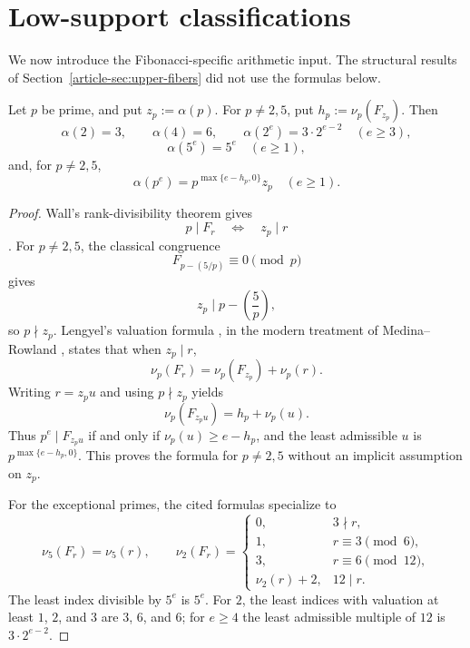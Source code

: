 \section{Low-support classifications}\label{sec:low-support}

We now introduce the Fibonacci-specific arithmetic input. The structural
results of Section~\ref{article-sec:upper-fibers} did not use the formulas below.

\begin{proposition}
\label{prop:prime-power-ladders}
Let $p$ be prime, and put $z_p:=\alpha(p)$. For $p\ne2,5$, put
$h_p:=\nu_p(F_{z_p})$. Then
\[
\alpha(2)=3,\qquad \alpha(4)=6,\qquad
\alpha(2^e)=3\cdot2^{e-2}\quad(e\ge3),
\]
\[
\alpha(5^e)=5^e\quad(e\ge1),
\]
and, for $p\ne2,5$,
\[
\alpha(p^e)=p^{\max\{e-h_p,0\}}z_p\quad(e\ge1).
\]
\end{proposition}

\begin{proof}
Wall's rank-divisibility theorem gives
\[
p\mid F_r\quad\Longleftrightarrow\quad z_p\mid r
\]
\cite{Wall1960FibonacciModm}. For $p\ne2,5$, the classical congruence
\[
F_{p-(5/p)}\equiv0\pmod p
\]
gives
\[
z_p\mid p-\left(\frac5p\right),
\]
so $p\nmid z_p$. Lengyel's valuation formula
\cite[Theorems~1 and~2]{Lengyel1995OrderFibonacciLucas}, in the modern
treatment of Medina--Rowland \cite{MedinaRowland2015PRegularity}, states that
when $z_p\mid r$,
\[
\nu_p(F_r)=\nu_p(F_{z_p})+\nu_p(r).
\]
Writing $r=z_pu$ and using $p\nmid z_p$ yields
\[
\nu_p(F_{z_pu})=h_p+\nu_p(u).
\]
Thus $p^e\mid F_{z_pu}$ if and only if
$\nu_p(u)\ge e-h_p$, and the least admissible $u$ is
$p^{\max\{e-h_p,0\}}$. This proves the formula for $p\ne2,5$ without an
implicit assumption on $z_p$.

For the exceptional primes, the cited formulas specialize to
\[
\nu_5(F_r)=\nu_5(r),
\qquad
\nu_2(F_r)=
\begin{cases}
0, & 3\nmid r,\\
1, & r\equiv3\pmod 6,\\
3, & r\equiv6\pmod {12},\\
\nu_2(r)+2, & 12\mid r.
\end{cases}
\]
The least index divisible by $5^e$ is $5^e$. For $2$, the least indices with
valuation at least $1$, $2$, and $3$ are $3$, $6$, and $6$; for $e\ge4$ the
least admissible multiple of $12$ is $3\cdot2^{e-2}$.
\end{proof}

